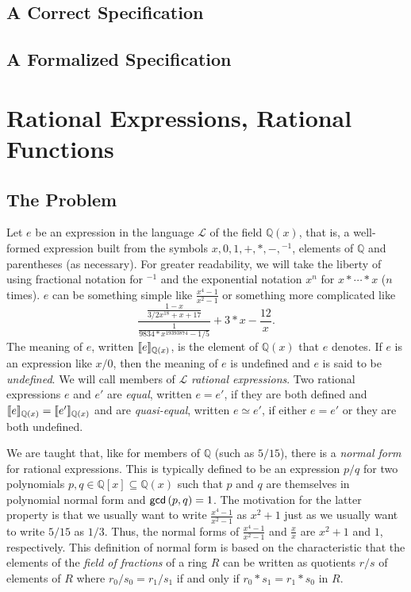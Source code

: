 \documentclass[fleqn]{llncs}
\begin{document}
\subsection{A Correct Specification}

\subsection{A Formalized Specification}

\newcommand{\QQ}{\ensuremath{\mathbb{Q}}}
\newcommand{\NRE}{\ensuremath{\mname{normRatExpr}}}
\newcommand{\funQ}[1]{\ensuremath{\LambdaApp x : \QQ \mdot#1}}
\newcommand{\Lang}{\ensuremath{\mathcal{L}}}

\section{Rational Expressions, Rational Functions}

\subsection{The Problem}

Let $e$ be an expression in the language $\Lang$ of the field
$\QQ(x)$, that is, a well-formed expression built from the symbols $x,
0, 1, +, *, -, \phantom{}^{-1}$, elements of $\QQ$ and parentheses (as
necessary).  For greater readability, we will take the liberty of
using fractional notation for $\phantom{}^{-1}$ and the exponential
notation $x^n$ for $x * \cdots * x$ ($n$ times).  $e$ can be something
simple like $\frac{x^4-1}{x^2-1}$ or something more complicated like
\begin{equation*}
\frac{\frac{1-x}{3/2 x^{18} + x + 17}}
     {\frac{1}{9834*x^{19393874}-1/5}}+3*x -\frac{12}{x}.
\end{equation*}
The meaning of $e$, written $\llbracket e\rrbracket_{\mathbb{Q}(x)}$, is the
element of $\QQ(x)$ that $e$ denotes.  If $e$ is an expression like
$x/0$, then the meaning of $e$ is undefined and $e$ is said to be
\emph{undefined}.  We will call members of $\Lang$ \emph{rational
  expressions}.  Two rational expressions $e$ and $e'$ are
\emph{equal}, written $e = e'$, if they are both defined and
$\llbracket e\rrbracket_{\mathbb{Q}(x)} = \llbracket e'\rrbracket_{\mathbb{Q}(x)}$ and are
\emph{quasi-equal}, written $e \simeq e'$, if either $e = e'$ or they
are both undefined.

We are taught that, like for members of $\QQ$ (such as $5/15$), there
is a \emph{normal form} for rational expressions. This is typically
defined to be an expression $p/q$ for two polynomials $p,q \in
\QQ\left[x\right] \subseteq \QQ(x)$ such that $p$ and $q$ are
themselves in polynomial normal form and $\mbox{\sf gcd}\left(p,q\right)
= 1$.  The motivation for the latter property is that we usually want
to write $\frac{x^4-1}{x^2-1}$ as $x^2 + 1$ just as we usually want to
write $5/15$ as $1/3$.  Thus, the normal forms of
$\frac{x^4-1}{x^2-1}$ and $\frac{x}{x}$ are $x^2 + 1$ and $1$,
respectively.  This definition of normal form is based on the
characteristic that the elements of the \emph{field of fractions} of a
ring $R$ can be written as quotients $r/s$ of elements of $R$ where
$r_0/s_0 = r_1/s_1$ if and only if $r_0 * s_1 = r_1 * s_0$ in $R$.
\end{document}

